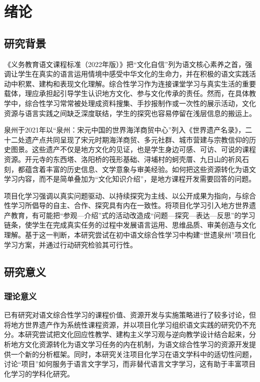 \chapter{绪论}

\section{研究背景}

《义务教育语文课程标准（2022年版）》把“文化自信”列为语文核心素养之首，强调让学生在真实的语言运用情境中感受中华文化的生命力，并在积极的语文实践活动中积累、建构和表现文化理解\cite{jiaoyubu2022}。综合性学习作为连接课堂学习与真实生活的重要载体，理应承担起引导学生认识地方文化、参与文化传承的责任。然而，在具体教学中，综合性学习常常被处理成资料搜集、手抄报制作或一次性的展示活动，文化资源与语言实践之间缺乏深度联结，学生的探究也容易停留在浅层信息的搬运上。

泉州于2021年以“泉州：宋元中国的世界海洋商贸中心”列入《世界遗产名录》，二十二处遗产点共同呈现了宋元时期海洋商贸、多元社群、城市营建与宗教信仰的历史图景\cite{quanzhou2021}。这些遗产不仅是地方文化的见证，也是学生身边可感、可访、可说的课程资源。开元寺的东西塔、洛阳桥的筏形基础、浔埔村的蚵壳厝、九日山的祈风石刻，都蕴含着丰富的历史信息、文学意象与审美经验。如何把这些资源转化为语文学习内容，而不是简单叠加为“文化知识介绍”，是地方课程开发需要回答的问题。

项目化学习强调以真实问题驱动、以持续探究为主线、以公开成果为指向，与综合性学习所倡导的自主、合作、探究具有内在一致性\cite{xiaxuemei2018}。将项目化学习引入地方世界遗产教育，有可能把“参观—介绍”式的活动改造成“问题—探究—表达—反思”的学习链条，使学生在完成真实任务的过程中发展语言运用、思维品质、审美创造与文化理解。基于这一判断，本研究尝试在初中语文综合性学习中构建“世遗泉州”项目化学习方案，并通过行动研究检验其可行性。

\section{研究意义}

\subsection{理论意义}

已有研究对语文综合性学习的课程价值、资源开发与实施策略进行了较多讨论，但将地方世界遗产作为系统性课程资源，并以项目化学习组织语文实践的研究仍不充分。本研究尝试把文化回应性教学、建构主义学习观与逆向教学设计结合起来，分析地方文化资源转化为语文学习任务的内在机制，为语文综合性学习的资源开发提供一个新的分析框架。同时，本研究关注项目化学习在语文学科中的适切性问题，讨论“项目”如何服务于语言文字学习，而非替代语言文字学习，这有助于丰富项目化学习的学科化研究。

